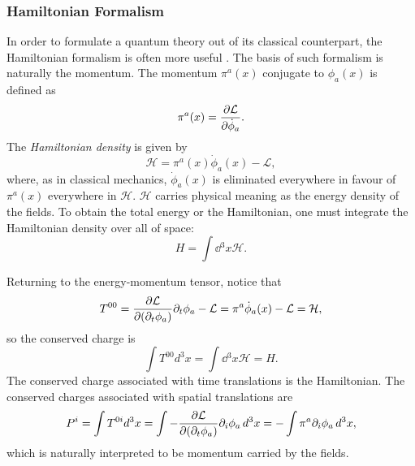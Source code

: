 
\subsubsection*{Hamiltonian Formalism}
In order to formulate a quantum theory out of its classical counterpart, the Hamiltonian formalism is often more useful \cite{peskin_introduction_1995}. The basis of such formalism is naturally the momentum. The momentum $\pi^a(x)$ conjugate to $\phi_a(x)$ is defined as $$\pi^a(x)=\pdv{\mathcal{L}}{\Dot{\phi}_a}.$$ The \textit{Hamiltonian density} is given by $$\mathcal{H}=\pi^a(x)\Dot{\phi}_a(x)-\mathcal{L},$$ where, as in classical mechanics, $\Dot{\phi}_a(x)$ is eliminated everywhere in favour of $\pi^a(x)$ everywhere in $\mathcal{H}$. $\mathcal{H}$ carries physical meaning as the energy density of the fields. To obtain the total energy or the Hamiltonian, one must integrate the Hamiltonian density over all of space: $$ H=\int\dd{^3x}\mathcal{H}.$$

Returning to the energy-momentum tensor, notice that
$$T^{00} = \pdv{\mathcal{L}}{(\partial_t \phi_a)}\partial_t \phi_a- \mathcal{L} = \pi^a \Dot{\phi}_a(x)-\mathcal{L} = \mathcal{H},$$ so the conserved charge is $$ \int T^{00} d^3 x = \int \dd{^3 x} \mathcal{H} = H.$$ The conserved charge associated with time translations is the Hamiltonian. The conserved charges associated with spatial translations are $$ P^i = \int T^{0i} d^3 x = \int -\pdv{\mathcal{L}}{(\partial_t \phi_a)}\partial_{i} \phi_a \,d^3x = -\int \pi^a \partial_{i} \phi_a \,d^3x,$$ which is naturally interpreted to be momentum carried by the fields.

